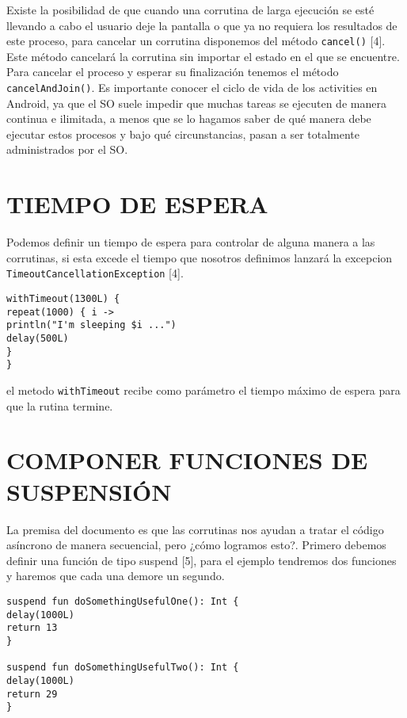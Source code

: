 \documentclass[twocolumn,10pt,abstract=on]{asme2ej}
\begin{document}
Existe la posibilidad de que cuando una corrutina de larga ejecución se esté llevando a cabo el usuario deje la pantalla o que ya no requiera los resultados de este proceso, para cancelar un corrutina disponemos del método \verb+cancel()+ [4]. Este método cancelará la corrutina sin importar el estado en el que se encuentre. Para cancelar el proceso y esperar su finalización tenemos el método \verb+cancelAndJoin()+.\linebreak\linebreak
Es importante conocer el ciclo de vida de los activities en Android, ya que el SO suele impedir que muchas tareas se ejecuten de manera continua e ilimitada, a menos que se lo hagamos saber de qué manera debe ejecutar estos procesos y bajo qué circunstancias, pasan a ser totalmente administrados por el SO.

\section{TIEMPO DE ESPERA}

Podemos definir un tiempo de espera para controlar de alguna manera a las corrutinas, si esta excede el tiempo que nosotros definimos lanzará la excepcion \verb+TimeoutCancellationException+ [4].

\begin{verbatim}
withTimeout(1300L) {
repeat(1000) { i ->
println("I'm sleeping $i ...")
delay(500L)
}
}
\end{verbatim}

el metodo \verb+withTimeout+ recibe como parámetro el tiempo máximo de espera para que la rutina termine.


\section{COMPONER FUNCIONES DE SUSPENSIÓN}

La premisa del documento es que las corrutinas nos ayudan a tratar el código asíncrono de manera secuencial, pero ¿cómo logramos esto?. \linebreak \linebreak
Primero debemos definir una función de tipo suspend [5], para el ejemplo tendremos dos funciones y haremos que cada una demore un segundo.

\begin{verbatim}
suspend fun doSomethingUsefulOne(): Int {
delay(1000L) 
return 13
}

suspend fun doSomethingUsefulTwo(): Int {
delay(1000L)
return 29
}
\end{verbatim}
\end{document}
